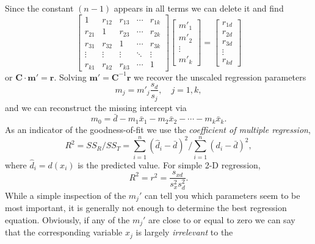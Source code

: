 Since the constant $(n-1)$ appears in all terms we can delete it and find
\begin{equation}
\left [ \begin{array}{ccccc}
1 & r_{12} & r_{13} & \cdots & r_{1k} \\
r_{21} & 1 & r_{23} &  \cdots & r_{2k} \\
r_{31} & r_{32} & 1 &  \cdots & r_{3k} \\
\vdots & \vdots & \vdots & \ddots & \vdots \\
r_{k1} & r_{k2} & r_{k3} & \cdots & 1 \end{array} \right ]
\left [
\begin{array}{c}
m'_1 \\ m'_2 \\ \vdots \\ m'_k \end{array} \right ] =
\left [ \begin{array}{c}
r_{1d} \\ r_{2d} \\ r_{3d} \\ \vdots \\ r_{kd}
\end{array} \right ]
\end{equation}	 	
or $\mathbf{C} \cdot \mathbf{m'} = \mathbf{r}$.  Solving $\mathbf{m' = C}^{-1}\mathbf{r}$ we recover the unscaled regression parameters
\begin{equation}
m_j = m'_j \frac{s_d}{s_j},\quad j = 1,k,
\end{equation}	 
and we can reconstruct the missing intercept via
\begin{equation}
m_0 = \bar{d} - m_1 \bar{x}_1 - m_2 \bar{x}_2 - \cdots - m_k \bar{x}_k.
\end{equation}	 
As an indicator of the goodness-of-fit we use the \emph{coefficient of multiple regression},
\begin{equation}
R^2 = SS_R/SS_T = \sum^n_{i=1} (\hat{d}_i - \bar{d})^2 / \sum^n_{i=1} (d_i - \bar{d})^2,
\end{equation}	 
where $\hat{d}_i = d(x_i)$ is the predicted value.  For simple 2-D regression,
\begin{equation}
R^2 = r^2 = \frac{s_{xd}}{s^2_x s^2_d}.
\end{equation}	 
	While a simple inspection of the $m_j'$ can tell you which parameters seem to be most important, 
it is generally not enough to determine the best regression equation.  Obviously, if any of the $m_j'$ 
are close to or equal to zero we can say that the corresponding variable $x_j$ is largely \emph{irrelevant} to the 
